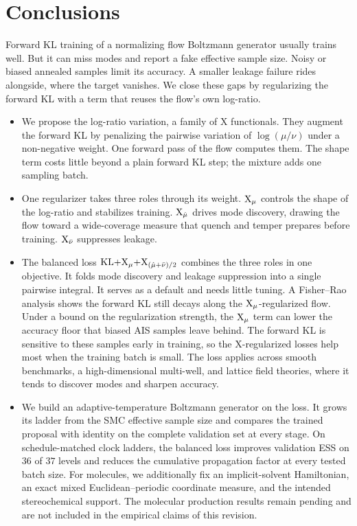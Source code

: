 \documentclass{article}
\begin{document}
\section{Conclusions}
\label{sec: conclusions}

Forward KL training of a normalizing flow Boltzmann generator usually trains well. But it can miss modes and report a fake effective sample size. Noisy or biased annealed samples limit its accuracy. A smaller leakage failure rides alongside, where the target vanishes. We close these gaps by regularizing the forward KL with a term that reuses the flow's own log-ratio.

\begin{itemize}
\item We propose the log-ratio variation, a family of X functionals. They augment the forward KL by penalizing the pairwise variation of $\log(\mu/\nu)$ under a non-negative weight. One forward pass of the flow computes them. The shape term costs little beyond a plain forward KL step; the mixture adds one sampling batch.
\item One regularizer takes three roles through its weight. $\mathrm{X}_\mu$ controls the shape of the log-ratio and stabilizes training. $\mathrm{X}_{\hat\mu}$ drives mode discovery, drawing the flow toward a wide-coverage measure that quench and temper prepares before training. $\mathrm{X}_{\bar\nu}$ suppresses leakage.
\item The balanced loss $\mathrm{KL}{+}\mathrm{X}_\mu{+}\mathrm{X}_{(\hat\mu+\bar\nu)/2}$ combines the three roles in one objective. It folds mode discovery and leakage suppression into a single pairwise integral. It serves as a default and needs little tuning. A Fisher--Rao analysis shows the forward KL still decays along the $\mathrm{X}_\mu$-regularized flow. Under a bound on the regularization strength, the $\mathrm{X}_\mu$ term can lower the accuracy floor that biased AIS samples leave behind. The forward KL is sensitive to these samples early in training, so the X-regularized losses help most when the training batch is small. The loss applies across smooth benchmarks, a high-dimensional multi-well, and lattice field theories, where it tends to discover modes and sharpen accuracy.
\item We build an adaptive-temperature Boltzmann generator on the loss. It grows its ladder from the SMC effective sample size and compares the trained proposal with identity on the complete validation set at every stage. On schedule-matched clock ladders, the balanced loss improves validation ESS on $36$ of $37$ levels and reduces the cumulative propagation factor at every tested batch size. For molecules, we additionally fix an implicit-solvent Hamiltonian, an exact mixed Euclidean--periodic coordinate measure, and the intended stereochemical support. The molecular production results remain pending and are not included in the empirical claims of this revision.
\end{itemize}
\end{document}

